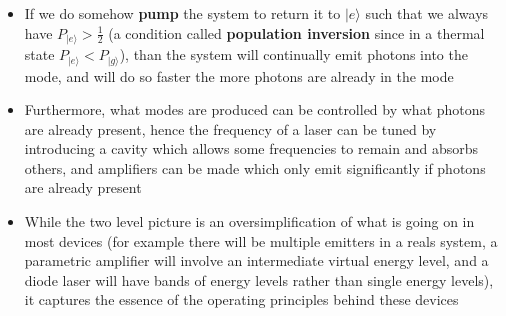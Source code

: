 \documentclass[english]{article}
\newcommand{\ket}[1]{|#1 \rangle}
\newcommand{\ketbra}[2]{\vert #1 \rangle \! \langle #2 \vert}
\begin{document}
\begin{itemize}
\begin{itemize}
\begin{enumerate}
\item Since $\hat{a}^\dagger\ket{n}=\sqrt{n+1}\ket{n+1}$\footnote{Recall from our notes on Bosons and Fermions that this factor can be derived mathematically from the exchange statistics of the photons} , than the rate of emission into a mode which already has photons scales with $\sqrt{n+1}$
\item In fact this system can be solved exactly if we start in the excited state with $n$ photons the probability of being in the excited state over time is $P_{\ket{e}}=\cos^2(\lambda t \sqrt{n+1})$, which is the modulous squared of  Eq.~4.110 in G+K (Many details of this model which I won't discuss can be found in G+K chapter 4)
\item The average over time will be $P_{\ket{e}}=\frac{1}{2}$ regardless of the original number of photons
\item Furthermore, if we consider a system which can emit into a continuum of modes 
\begin{equation}
\hat{H}=\frac{1}{2}\omega_0\left(\ketbra{e}{e}-\ketbra{g}{g}\right)+\int d\omega \left[\omega' \hat{a}_\omega^\dagger \hat{a}_\omega+ \lambda \left(\hat{\sigma}_-\hat{a}_\omega^\dagger+\hat{\sigma}_+\hat{a}_\omega\right)\right]
\end{equation}
than the system will preferentially emit into modes which are already occupied by many photons\footnote{You might notice that now in general $\omega\neq \omega_0$, so a solution for emitting in to a single one of these modes will be slightly more complicated but is still possible and discussed in 4.6 of G+K}
\end{enumerate}
\end{itemize}
\item If we do somehow \textbf{pump} the system to return it to $\ket{e}$ such that we always have $P_{\ket{e}}>\frac{1}{2}$ (a condition called \textbf{population inversion} since in a thermal state $P_{\ket{e}}<P_{\ket{g}}$), than the system will continually emit photons into the mode, and will do so faster the more photons are already in the mode
\item Furthermore, what modes are produced can be controlled by what photons are already present, hence the frequency of a laser can be tuned by introducing a cavity which allows some frequencies to remain and absorbs others, and amplifiers can be made which only emit significantly if photons are already present
\item While the two level picture is an oversimplification of what is going on in most devices (for example there will be multiple emitters in a reals system, a parametric amplifier will involve an intermediate virtual energy level, and a diode laser will have bands of energy levels rather than single energy levels), it captures the essence of the operating principles behind these devices

\end{itemize}
\end{document}
